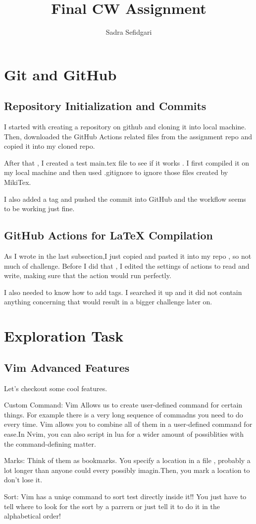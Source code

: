 \documentclass[titlepage]{article}
\title{Final CW Assignment}
\author{Sadra Sefidgari}
\begin{document}
\maketitle

\section{Git and GitHub}
\subsection{Repository Initialization and Commits}
I started with creating a repository on github and cloning it into local machine.
Then, downloaded the GitHub Actions related files from the assignment repo and copied it into my cloned repo.

After that , I created a test main.tex file to see if it works .
I first compiled it on my local machine and then used .gitignore to ignore those files created by MikiTex.

I also added a tag and pushed the commit into GitHub and the workflow seems to be working just fine.
\subsection{GitHub Actions for LaTeX Compilation}

As I wrote in the last subsection,I just copied and pasted it into my repo , so not much of challenge.
Before I did that , I edited the settings of actions to read and write, making sure that the action would run perfectly.

I also needed to know how to add tags. I searched it up and it did not contain anything concerning that would result in a bigger challenge later on.

\section{Exploration Task}
\subsection{Vim Advanced Features}
Let's checkout some cool features.

Custom Command: Vim Allows us to create user-defined command for certain things. For example there is a very long sequence of commadns you need to do every time.
Vim allows you to combine all of them in a user-defined command for ease.In Nvim, you can also script in lua for a wider amount of possiblities with the command-defining matter.

Marks: Think of them as bookmarks. You specify a location in a file , probably a lot longer than anyone could every possibly imagin.Then, you mark a location to don't lose it.

Sort: Vim has a uniqe command to sort test directly inside it!! You just have to tell where to look for the sort by a parrern or just tell it to do it in the alphabetical order!




  
\end{document}
